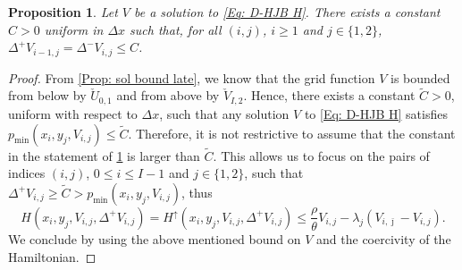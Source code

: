 \documentclass[11pt]{article}
\numberwithin{equation}{section}
\numberwithin{algorithm}{section}
\newtheorem{proposition}[proposition]{Proposition}
\newcommand{\lc}{\left(}
\newcommand{\rc}{\right)}
\theoremstyle{plain}
\newcommand{\D}{\Delta}
\begin{document}
\begin{proposition}\label{Prop: discrete Dv bound}
Let $V$ be a solution to \cref{Eq: D-HJB H}. There exists a constant $C>0$ uniform in $\D x$ such that, for all $(i,j)$, $i\geq 1$ and $j\in \{1,2\}$, $\D^+{V_{i-1,j}}=\D^-{V_{i,j}}\leq C$.
\end{proposition}

\begin{proof} From \cref{Prop: sol bound late}, we know that the grid function $V$ is bounded from below by $\check{U}_{0,1}$ and from above by $\check{V}_{I,2}$. Hence, there exists a constant $\tilde{C}>0$, uniform with respect to $\D x$, such that any solution $V$ to \cref{Eq: D-HJB H} satisfies ${p}_{\min}\lc x_i,y_j,V_{i,j}\rc\leq \tilde{C}$. Therefore, it is not restrictive to assume that the constant in the statement of \cref{Prop: discrete Dv bound} is larger than $\tilde{C}$. This allows us to focus on the pairs of indices $(i,j)$, $0\leq i\leq I-1$ and $j\in \{1,2\}$, such that $\D^+{V_{i,j}}\geq \tilde{C}>{p}_{\min}\lc x_i,y_j,V_{i,j}\rc$, thus
$$
H\lc x_i,y_j,V_{i,j},\D^+{V_{i,j}}\rc={H}^{\uparrow} \lc x_i,y_j,V_{i,j},\D^+{V_{i,j}}\rc\leq \frac{\rho}{\theta} V_{i,j}-\lambda_j\lc V_{i,\bar \jmath}-V_{i,j} \rc.
$$
We conclude by using the above mentioned bound on $V$ and the coercivity of the Hamiltonian. 
\end{proof}
\end{document}
